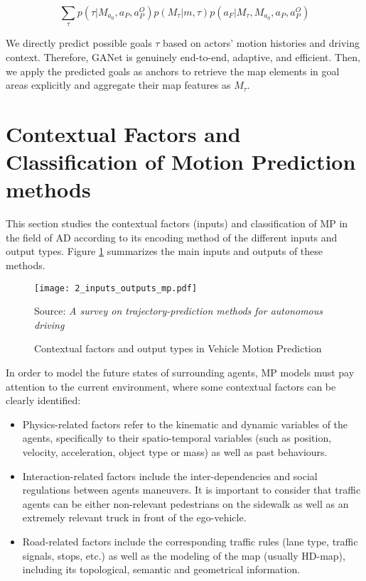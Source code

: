 \begin{equation}
	\sum _{\tau}{p(\tau|M_{a_0}, a_P, a^O_P) p(M_{\tau}|m, \tau)p(a_F|M_{\tau},M_{a_0}, a_P, a^O_P)}
\end{equation}

We directly predict possible goals $\tau$ based on actors' motion histories and driving context. Therefore, GANet is genuinely end-to-end, adaptive, and efficient. 
Then, we apply the predicted goals as anchors to retrieve the map elements in goal areas explicitly and aggregate their map features as $M_{\tau}$.

\section{Contextual Factors and Classification of Motion Prediction methods}
\label{sec:2_contextual_factors_and_classification_mp}

This section studies the contextual factors (inputs) and classification of \ac{MP} in the field of \ac{AD} according to its encoding method of the different inputs and output types. Figure \ref{fig:2_input_output_mp} \cite{huang2022survey} summarizes the main inputs and outputs of these methods. \\

\begin{figure}[h]
	\centering
	\texttt{[image: 2\_inputs\_outputs\_mp.pdf]}
	\caption{Contextual factors and output types in Vehicle Motion Prediction}
	Source: \textit{A survey on trajectory-prediction methods for autonomous driving} \cite{huang2022survey}
	\label{fig:2_input_output_mp}
\end{figure}

In order to model the future states of surrounding agents, \ac{MP} models must pay attention to the current environment, where some contextual factors can be clearly identified:

\begin{itemize}
	\item Physics-related factors refer to the kinematic and dynamic variables of the agents, specifically to their spatio-temporal variables (such as position, velocity, acceleration, object type or mass) as well as past behaviours. 
	\item Interaction-related factors include the inter-dependencies and social regulations between agents maneuvers. It is important to consider that traffic agents can be either non-relevant pedestrians on the sidewalk as well as an extremely relevant truck in front of the ego-vehicle.
	\item Road-related factors include the corresponding traffic rules (lane type, traffic signals, stops, etc.) as well as the modeling
	of the map (usually HD-map), including its topological, semantic and geometrical information.
\end{itemize}

